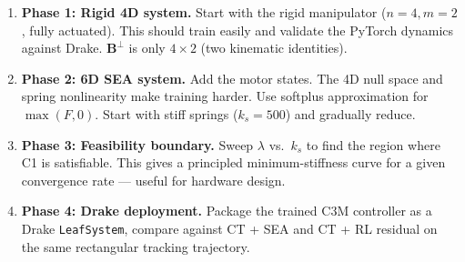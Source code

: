 \documentclass[11pt, a4paper]{article}
\newcommand{\bB}{\bm{B}}
\begin{document}
\begin{enumerate}
\item \textbf{Phase 1: Rigid 4D system.}
      Start with the rigid manipulator ($n = 4, m = 2$, fully actuated).
      This should train easily and validate the PyTorch dynamics
      against Drake.  $\bB^\perp$ is only $4 \times 2$
      (two kinematic identities).

\item \textbf{Phase 2: 6D SEA system.}
      Add the motor states.  The 4D null space and spring nonlinearity
      make training harder.  Use softplus approximation for $\max(F, 0)$.
      Start with stiff springs ($k_s = 500$) and gradually reduce.

\item \textbf{Phase 3: Feasibility boundary.}
      Sweep $\lambda$ vs.\ $k_s$ to find the region where C1 is
      satisfiable.  This gives a principled minimum-stiffness curve
      for a given convergence rate --- useful for hardware design.

\item \textbf{Phase 4: Drake deployment.}
      Package the trained C3M controller as a Drake \texttt{LeafSystem},
      compare against CT + SEA and CT + RL residual on the same
      rectangular tracking trajectory.
\end{enumerate}
\end{document}
